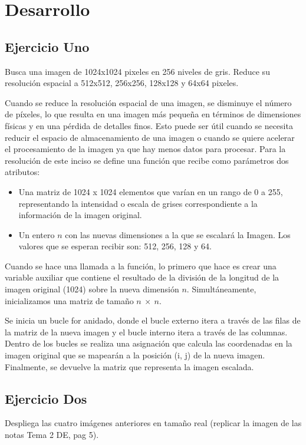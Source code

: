 \documentclass[
  journal=largetwo,
  manuscript=Practica-Dos,
  year=2024-1, %
  volume=37,
  spanish, %
]{cup-journal}
\begin{document}
\section{Desarrollo}


\subsection{Ejercicio Uno}

Busca una imagen de 1024x1024 pixeles en 256 niveles de gris. Reduce su resolución espacial a 512x512, 256x256, 128x128 y 64x64 pixeles. 

Cuando se reduce la resolución espacial de una imagen, se disminuye el número de píxeles, lo que resulta en una imagen más pequeña en términos de dimensiones físicas y en una pérdida de detalles finos. Esto puede ser útil cuando se necesita reducir el espacio de almacenamiento de una imagen o cuando se quiere acelerar el procesamiento de la imagen ya que hay menos datos para procesar. Para la resolución de este inciso se define una función que recibe como parámetros dos atributos: 

\begin{itemize}
    \item Una matriz de 1024 x 1024 elementos que varían en un rango de 0 a 255, representando la intensidad o escala de grises correspondiente a la información de la imagen original.
    \item Un entero $n$ con las nuevas dimensiones a la que se escalará la Imagen. Los valores que se esperan recibir son: 512, 256, 128 y 64.
\end{itemize}

Cuando se hace una llamada a la función, lo primero que hace es crear una variable auxiliar que contiene el resultado de la división de la longitud de la imagen original (1024) sobre la nueva dimensión $n$. Simultáneamente, inicializamos una matriz de tamaño $n\:\times \:n$.

Se inicia un bucle for anidado, donde el bucle externo itera a través de las filas de la matriz de la nueva imagen y el bucle  interno itera a través de las columnas. Dentro de los bucles se realiza una asignación que calcula las coordenadas en la imagen original que se mapearán a la posición (i, j) de la nueva imagen. Finalmente, se devuelve la matriz que representa la imagen escalada.

\subsection{Ejercicio Dos}
Despliega las cuatro imágenes anteriores en tamaño real (replicar la imagen de las notas Tema 2 DE, pag 5).
\end{document}
